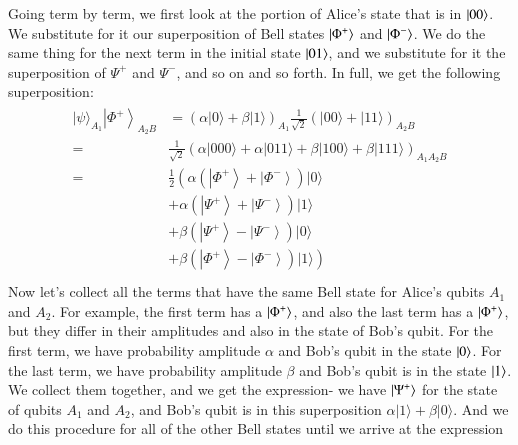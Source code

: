 Going term by term, we first look at the portion of Alice's state that is in $\left| 00 \right\rangle$.
We substitute for it our superposition of Bell states $\left| \Phi^+ \right\rangle$ and $\left| \Phi^- \right\rangle$. We do the same thing for the next term in the initial state $\left| 01 \right\rangle$, and we substitute for it the superposition of $\Psi^+$ and $\Psi^-$, and so on and so forth. In full, we get the following superposition:
\begin{align}
    \begin{aligned}
        |\psi\rangle_{A_{1}}\left|\Phi^{+}\right\rangle_{A_{2} B} &=(\alpha|0\rangle+\beta|1\rangle)_{A_{1}} \frac{1}{\sqrt{2}}(|00\rangle+|11\rangle)_{A_{2} B} \\
        =&\frac{1}{\sqrt{2}}(\alpha|000\rangle+\alpha|011\rangle+\beta|100\rangle+\beta|111\rangle)_{A_{1} A_{2} B} \\
        =& \frac{1}{2}\left(\alpha\left(\left|\Phi^{+}\right\rangle+\left|\Phi^{-}\right\rangle\right)|0\rangle\right.\\
        &+\alpha\left(\left|\Psi^{+}\right\rangle+\left|\Psi^{-}\right\rangle\right)|1\rangle \\
        &+\beta\left(\left|\Psi^{+}\right\rangle-\left|\Psi^{-}\right\rangle\right)|0\rangle \\
        &\left.+\beta\left(\left|\Phi^{+}\right\rangle-\left|\Phi^{-}\right\rangle\right)|1\rangle\right) \\
\end{aligned}
\end{align}
Now let's collect all the terms that have the same Bell state for Alice's qubits $A_1$ and $A_2$. For example, the first term has a $\left| \Phi^+ \right\rangle$, and also the last term has a $\left| \Phi^+ \right\rangle$, but they differ in their amplitudes and also in the state of Bob's qubit. For the first term, we have probability amplitude $\alpha$ and Bob's qubit in the state $\left| 0 \right\rangle$. For the last term, we have probability amplitude $\beta$ and Bob's qubit is in the state $\left| 1 \right\rangle$. We collect them together, and we get the expression- we have $\left| \Psi^+ \right\rangle$ for the state of qubits $A_1$ and $A_2$, and Bob's qubit is in this superposition $\alpha|1\rangle+\beta|0\rangle$. And we do this procedure for all of the other Bell states until we arrive at the expression
